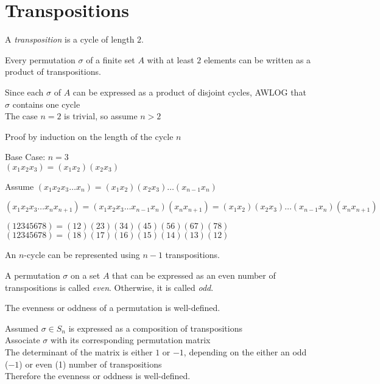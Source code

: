 \documentclass[letterpaper,12pt,fleqn]{article}
\renewcommand{\o}{\sigma}
\begin{document}
\section*{Transpositions}

\begin{definition}
  A \emph{transposition} is a cycle of length $2$.
\end{definition}

\begin{theorem}
  Every permutation $\o$ of a finite set $A$ with at least $2$ elements can be
  written as a product of transpositions.
\end{theorem}

\begin{theproof}
  Since each $\o$ of $A$ can be expressed as a product of disjoint cycles,
  AWLOG that $\o$ contains one cycle \\
  The case $n=2$ is trivial, so assume $n>2$

  Proof by induction on the length of the cycle $n$

  \begin{description}
  \item Base Case: $n=3$ \\
    $(x_1x_2x_3)=(x_1x_2)(x_2x_3)$
  \item Assume $(x_1x_2x_3\ldots x_n)=(x_1x_2)(x_2x_3)\ldots(x_{n-1}x_n)$
  \item $(x_1x_2x_3\ldots x_nx_{n+1})=(x_1x_2x_3\ldots x_{n-1}x_n)(x_nx_{n+1})=
    (x_1x_2)(x_2x_3)\ldots(x_{n-1}x_n)(x_nx_{n+1})$
  \end{description}
\end{theproof}

\begin{example}
  $(12345678)=(12)(23)(34)(45)(56)(67)(78)$ \\
  $(12345678)=(18)(17)(16)(15)(14)(13)(12)$
\end{example}

\begin{corollary}
  An $n$-cycle can be represented using $n-1$ transpositions.
\end{corollary}

\begin{definition}
  A permutation $\o$ on a set $A$ that can be expressed as an even number of
  transpositions is called \emph{even}. Otherwise, it is called \emph{odd}.
\end{definition}

\begin{theorem}
  The evenness or oddness of a permutation is well-defined.
\end{theorem}

\begin{theproof}
  Assumed $\o\in S_n$ is expressed as a composition of transpositions \\
  Associate $\o$ with its corresponding permutation matrix \\
  The determinant of the matrix is either $1$ or $-1$, depending on the either
  an odd ($-1$) or even (1) number of transpositions \\
  Therefore the evenness or oddness is well-defined.
\end{theproof}
\end{document}
